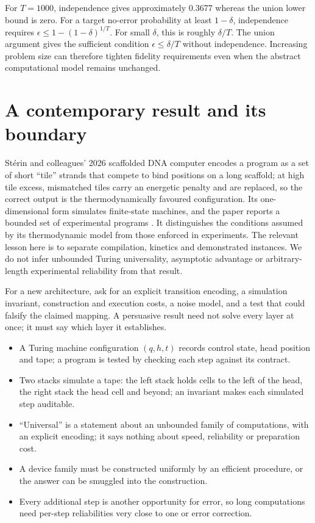 For $T=1000$, independence gives approximately 0.3677 whereas the union
lower bound is zero. For a target no-error probability at least $1-\delta$,
independence requires $\epsilon\leq1-(1-\delta)^{1/T}$.
For small $\delta$, this is roughly $\delta/T$. The union argument gives
the sufficient condition $\epsilon\leq\delta/T$ without independence.
Increasing problem size can therefore tighten fidelity requirements even
when the abstract computational model remains unchanged.

\section{A contemporary result and its boundary}
Stérin and colleagues' 2026 scaffolded DNA computer encodes a program as a set of
short ``tile'' strands that compete to bind positions on a long scaffold; at high
tile excess, mismatched tiles carry an energetic penalty and are replaced, so the
correct output is the thermodynamically favoured configuration. Its
one-dimensional form simulates finite-state machines, and the paper reports a
bounded set of experimental programs \cite{Sterin2026}. It distinguishes the
conditions assumed by its thermodynamic model from those enforced in
experiments. The relevant lesson
here is to separate compilation, kinetics and demonstrated instances. We do
not infer unbounded Turing universality, asymptotic advantage or arbitrary-length
experimental reliability from that result.

For a new architecture, ask for an explicit transition encoding, a simulation
invariant, construction and execution costs, a noise model, and a test that
could falsify the claimed mapping. A persuasive result need not solve every
layer at once; it must say which layer it establishes.

\begin{KeyIdeas}
\begin{itemize}\setlength{\itemsep}{2pt}
\item A Turing machine configuration $(q,h,t)$ records control state, head
position and tape; a program is tested by checking each step against its
contract.
\item Two stacks simulate a tape: the left stack holds cells to the left of the
head, the right stack the head cell and beyond; an invariant makes each simulated
step auditable.
\item ``Universal'' is a statement about an unbounded family of computations, with
an explicit encoding; it says nothing about speed, reliability or preparation
cost.
\item A device family must be constructed uniformly by an efficient procedure,
or the answer can be smuggled into the construction.
\item Every additional step is another opportunity for error, so long
computations need per-step reliabilities very close to one or error correction.
\end{itemize}
\end{KeyIdeas}

